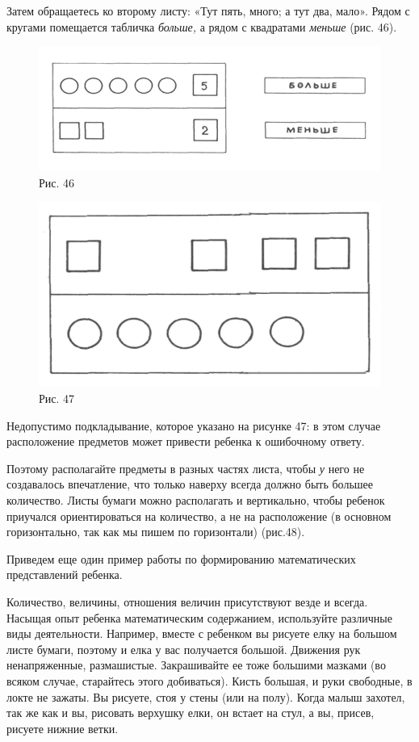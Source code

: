 \documentclass[a5paper]{book}
\renewcommand{\emph}[1]{\textit{#1}}
\begin{document}
Затем обращаетесь ко второму листу: «Тут пять, много; а тут два, мало».
Рядом с кругами помещается табличка \emph{больше,} а рядом с квадратами
\emph{меньше} (рис. 46).

\begin{figure}
\centering
\includegraphics[width=\linewidth]{media/media/image42.png}
\caption*{Рис. 46}
\end{figure}

\begin{figure}
\centering
\includegraphics[width=\linewidth]{media/media/image43.png}
\caption*{Рис. 47}
\end{figure}

Недопустимо подкладывание, которое указано на рисунке 47: в этом случае
расположение предметов может привести ребенка к ошибочному ответу.

Поэтому располагайте предметы в разных частях листа, чтобы \emph{у} него
не создавалось впечатление, что только наверху всегда должно быть
большее количество. Листы бумаги можно располагать и вертикально, чтобы
ребенок приучался ориентироваться на количество, а не на расположение (в
основном горизонтально, так как мы пишем по горизонтали) (рис.48).

Приведем еще один пример работы по формированию математических
представлений ребенка.

Количество, величины, отношения величин присутствуют везде и всегда.
Насыщая опыт ребенка математическим содержанием, используйте различные
виды деятельности. Например, вместе с ребенком вы рисуете елку на
большом листе бумаги, поэтому и елка у вас получается большой. Движения
рук ненапряженные, размашистые. Закрашивайте ее тоже большими мазками
(во всяком случае, старайтесь этого добиваться). Кисть большая, и руки
свободные, в локте не зажаты. Вы рисуете, стоя у стены (или на полу).
Когда малыш захотел, так же как и вы, рисовать верхушку елки, он встает
на стул, а вы, присев, рисуете нижние ветки.
\end{document}
